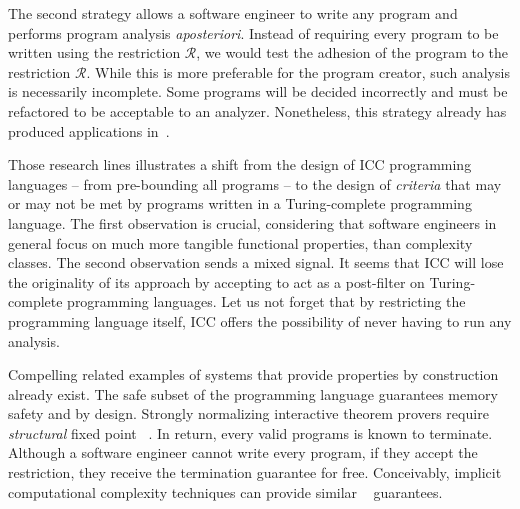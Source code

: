 The second strategy allows a software engineer to write any program and performs
program analysis \emph{aposteriori}. Instead of requiring every program to be
written using the restriction \(\mathcal{R}\), we would test
the adhesion of the program to the restriction
\(\mathcal{R}\). While this is more preferable for the
program creator, such analysis is necessarily incomplete.
Some programs will be decided incorrectly and must be refactored to be
acceptable to an analyzer. Nonetheless, this strategy already has produced
applications in~\textcite{moyen2016,moyen20172}.

Those research lines illustrates a shift from the design of ICC programming
languages -- from pre-bounding all programs -- to the design of \emph{criteria}
that may or may not be met by programs written in a
Turing-complete programming language. The first
observation is crucial, considering that software engineers in general focus on
much more tangible functional properties, than complexity classes. The second
observation sends a mixed signal. It seems that ICC will lose the originality of
its approach by accepting to act as a post-filter on
Turing-complete programming languages. Let us not
forget that by restricting the programming language itself, ICC offers the
possibility of never having to run any analysis.

Compelling related examples of systems that provide properties by construction
already exist. The safe subset of the programming language  guarantees
\eg memory safety and  by design. Strongly normalizing
interactive theorem provers require \emph{structural} fixed point
~\cite{bertot2004}. In return, every valid programs is known to
terminate. Although a software engineer cannot write every program, if they
accept the restriction, they receive the termination guarantee for free.
Conceivably, implicit computational complexity techniques can provide similar
\emph{}~\cite{terbeek2018} guarantees.
